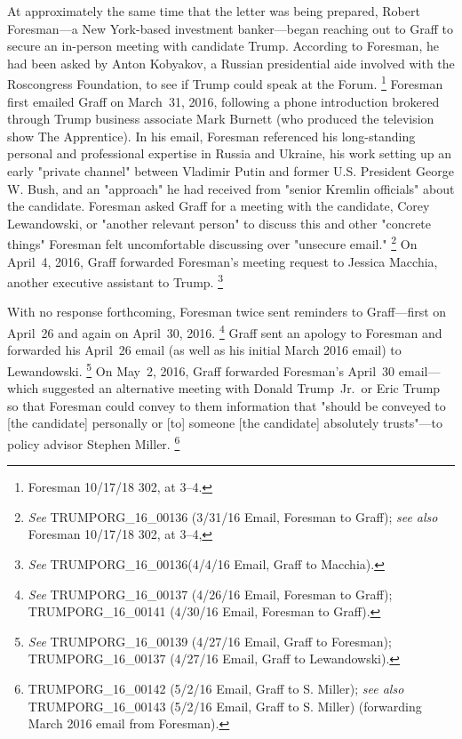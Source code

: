 At approximately the same time that the letter was being prepared, Robert Foresman---a New York-based investment banker---began reaching out to Graff to secure an in-person meeting with candidate Trump.
According to Foresman, he had been asked by Anton Kobyakov, a Russian presidential aide involved with the Roscongress Foundation, to see if Trump could speak at the Forum.%
\footnote{Foresman 10/17/18 302, at 3--4.}
Foresman first emailed Graff on March~31, 2016, following a phone introduction brokered through Trump business associate Mark Burnett (who produced the television show The Apprentice).
In his email, Foresman referenced his long-standing personal and professional expertise in Russia and Ukraine, his work setting up an early "private channel" between Vladimir Putin and former U.S. President George W. Bush, and an "approach" he had received from "senior Kremlin officials" about the candidate.
Foresman asked Graff for a meeting with the candidate, Corey Lewandowski, or "another relevant person" to discuss this and other "concrete things" Foresman felt uncomfortable discussing over "unsecure email."%
\footnote{\textit{See} TRUMPORG\_16\_00136 (3/31/16 Email, Foresman to Graff);
\textit{see also} Foresman 10/17/18 302, at 3--4,}
On April~4, 2016, Graff forwarded Foresman's meeting request to Jessica Macchia, another executive assistant to Trump.%
\footnote{\textit{See} TRUMPORG\_16\_00136(4/4/16 Email, Graff to Macchia).}

With no response forthcoming, Foresman twice sent reminders to Graff---first on April~26 and again on April~30, 2016.%
\footnote{\textit{See} TRUMPORG\_16\_00137 (4/26/16 Email, Foresman to Graff);
TRUMPORG\_16\_00141 (4/30/16 Email, Foresman to Graff).}
Graff sent an apology to Foresman and forwarded his April~26 email (as well as his initial March 2016 email) to Lewandowski.%
\footnote{\textit{See} TRUMPORG\_16\_00139 (4/27/16 Email, Graff to Foresman);
TRUMPORG\_16\_00137 (4/27/16 Email, Graff to Lewandowski).}
On May~2, 2016, Graff forwarded Foresman's April~30 email---which suggested an alternative meeting with Donald Trump~Jr.\ or Eric Trump so that Foresman could convey to them information that "should be conveyed to [the candidate] personally or [to] someone [the candidate] absolutely trusts"---to policy advisor Stephen Miller.%
\footnote{TRUMPORG\_16\_00142 (5/2/16 Email, Graff to S. Miller);
\textit{see also} TRUMPORG\_16\_00143 (5/2/16 Email, Graff to S. Miller) (forwarding March 2016 email from Foresman).}

